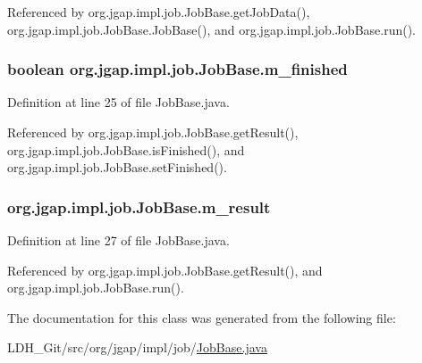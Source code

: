 Referenced by org.\-jgap.\-impl.\-job.\-Job\-Base.\-get\-Job\-Data(), org.\-jgap.\-impl.\-job.\-Job\-Base.\-Job\-Base(), and org.\-jgap.\-impl.\-job.\-Job\-Base.\-run().

\hypertarget{classorg_1_1jgap_1_1impl_1_1job_1_1_job_base_aec532538d18dd97bde153384da60329d}{
\subsubsection[{m\-\_\-finished}]{\setlength{\rightskip}{0pt plus 5cm}boolean org.\-jgap.\-impl.\-job.\-Job\-Base.\-m\-\_\-finished\hspace{0.3cm}{\ttfamily [private]}}}\label{classorg_1_1jgap_1_1impl_1_1job_1_1_job_base_aec532538d18dd97bde153384da60329d}


Definition at line 25 of file Job\-Base.\-java.



Referenced by org.\-jgap.\-impl.\-job.\-Job\-Base.\-get\-Result(), org.\-jgap.\-impl.\-job.\-Job\-Base.\-is\-Finished(), and org.\-jgap.\-impl.\-job.\-Job\-Base.\-set\-Finished().

\hypertarget{classorg_1_1jgap_1_1impl_1_1job_1_1_job_base_af13593fce355fca220745c657ae6989e}{
\subsubsection[{m\-\_\-result}]{ org.\-jgap.\-impl.\-job.\-Job\-Base.\-m\-\_\-result\hspace{0.3cm}{\ttfamily [private]}}}\label{classorg_1_1jgap_1_1impl_1_1job_1_1_job_base_af13593fce355fca220745c657ae6989e}


Definition at line 27 of file Job\-Base.\-java.



Referenced by org.\-jgap.\-impl.\-job.\-Job\-Base.\-get\-Result(), and org.\-jgap.\-impl.\-job.\-Job\-Base.\-run().



The documentation for this class was generated from the following file\-:\begin{DoxyCompactItemize}
\item 
L\-D\-H\-\_\-\-Git/src/org/jgap/impl/job/\hyperlink{_job_base_8java}{Job\-Base.\-java}\end{DoxyCompactItemize}
